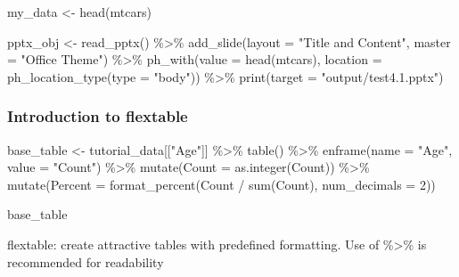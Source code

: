 \documentclass[
]{book}
\newenvironment{Shaded}{\begin{snugshade}}{\end{snugshade}}
\newcommand{\AttributeTok}[1]{\textcolor[rgb]{0.77,0.63,0.00}{#1}}
\newcommand{\DecValTok}[1]{\textcolor[rgb]{0.00,0.00,0.81}{#1}}
\newcommand{\FunctionTok}[1]{\textcolor[rgb]{0.00,0.00,0.00}{#1}}
\newcommand{\NormalTok}[1]{#1}
\newcommand{\OtherTok}[1]{\textcolor[rgb]{0.56,0.35,0.01}{#1}}
\newcommand{\SpecialCharTok}[1]{\textcolor[rgb]{0.00,0.00,0.00}{#1}}
\newcommand{\StringTok}[1]{\textcolor[rgb]{0.31,0.60,0.02}{#1}}
\begin{document}
\begin{Shaded}
\begin{Highlighting}[]
\NormalTok{my\_data }\OtherTok{\textless{}{-}} \FunctionTok{head}\NormalTok{(mtcars)}

\NormalTok{pptx\_obj }\OtherTok{\textless{}{-}} \FunctionTok{read\_pptx}\NormalTok{() }\SpecialCharTok{\%\textgreater{}\%}
  \FunctionTok{add\_slide}\NormalTok{(}\AttributeTok{layout =} \StringTok{"Title and Content"}\NormalTok{, }\AttributeTok{master =} \StringTok{"Office Theme"}\NormalTok{) }\SpecialCharTok{\%\textgreater{}\%}
  \FunctionTok{ph\_with}\NormalTok{(}\AttributeTok{value =} \FunctionTok{head}\NormalTok{(mtcars), }\AttributeTok{location =} \FunctionTok{ph\_location\_type}\NormalTok{(}\AttributeTok{type =} \StringTok{"body"}\NormalTok{)) }\SpecialCharTok{\%\textgreater{}\%}
  \FunctionTok{print}\NormalTok{(}\AttributeTok{target =} \StringTok{"output/test4.1.pptx"}\NormalTok{) }
\end{Highlighting}
\end{Shaded}

\hypertarget{introduction-to-flextable}{%
\subsubsection{Introduction to flextable}\label{introduction-to-flextable}}

\begin{Shaded}
\begin{Highlighting}[]
\NormalTok{base\_table }\OtherTok{\textless{}{-}}\NormalTok{ tutorial\_data[[}\StringTok{"Age"}\NormalTok{]] }\SpecialCharTok{\%\textgreater{}\%}
  \FunctionTok{table}\NormalTok{() }\SpecialCharTok{\%\textgreater{}\%}
  \FunctionTok{enframe}\NormalTok{(}\AttributeTok{name =} \StringTok{"Age"}\NormalTok{, }\AttributeTok{value =} \StringTok{"Count"}\NormalTok{) }\SpecialCharTok{\%\textgreater{}\%}
  \FunctionTok{mutate}\NormalTok{(}\AttributeTok{Count =} \FunctionTok{as.integer}\NormalTok{(Count)) }\SpecialCharTok{\%\textgreater{}\%}
  \FunctionTok{mutate}\NormalTok{(}\AttributeTok{Percent =} \FunctionTok{format\_percent}\NormalTok{(Count }\SpecialCharTok{/} \FunctionTok{sum}\NormalTok{(Count), }\AttributeTok{num\_decimals =} \DecValTok{2}\NormalTok{))}

\NormalTok{base\_table }
\end{Highlighting}
\end{Shaded}

flextable: create attractive tables with predefined formatting. Use of \%\textgreater\% is recommended for readability
\end{document}
